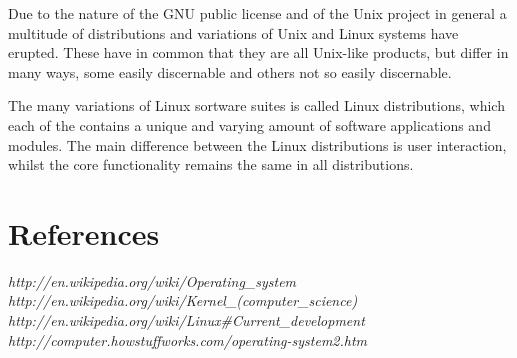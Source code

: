\documentclass[a4paper,10pt]{article}
\begin{document}
Due to the nature of the GNU public license and of the Unix project in general a multitude of distributions and variations of Unix and Linux systems have erupted. These have in common that they are all Unix-like products, but differ in many ways, some easily discernable and others not so easily discernable.

The many variations of Linux sortware suites is called Linux distributions, which each of the contains a unique and varying amount of software applications and modules. The main difference between the Linux distributions is user interaction, whilst the core functionality remains the same in all distributions.

\section*{References}
\textit{http://en.wikipedia.org/wiki/Operating\_system} \\
\textit{http://en.wikipedia.org/wiki/Kernel\_(computer\_science)} \\
\textit{http://en.wikipedia.org/wiki/Linux\#Current\_development} \\
\textit{http://computer.howstuffworks.com/operating-system2.htm} \\
\end{document}
